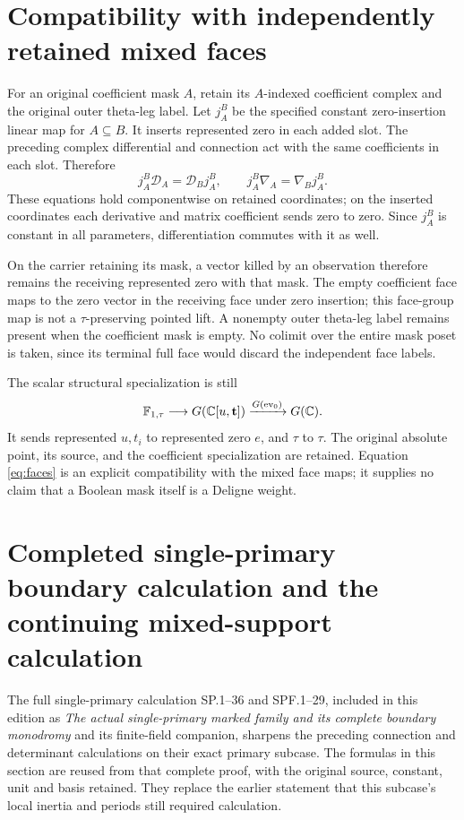 \section{Compatibility with independently retained mixed faces}

For an original coefficient mask $A$, retain its $A$-indexed coefficient
complex and the original outer theta-leg label.  Let
$j_A^B$ be the specified constant zero-insertion linear map for
$A\subseteq B$.  It inserts represented zero in each added slot.
The preceding complex differential and connection act with the same
coefficients in each slot.  Therefore
\begin{equation}
 j_A^B\mathcal D_A=\mathcal D_Bj_A^B,
 \qquad j_A^B\nabla_A=\nabla_Bj_A^B.
 \label{eq:faces}
\end{equation}
These equations hold componentwise on retained coordinates; on the
inserted coordinates each derivative and matrix coefficient sends zero
to zero.  Since $j_A^B$ is constant in all parameters, differentiation
commutes with it as well.

On the carrier retaining its mask, a vector killed by an observation
therefore remains the receiving represented zero with that mask.
The empty coefficient face maps to the zero vector in the receiving
face under zero insertion; this face-group map is not a
$\tau$-preserving pointed lift.  A nonempty outer theta-leg label
remains present when the coefficient mask is empty.  No colimit over
the entire mask poset is taken, since its terminal full face would
discard the independent face labels.

The scalar structural specialization is still
\[
 \mathbb F_{1,\tau}\longrightarrow G(\mathbb C[u,\mathbf t])
       \xrightarrow{G(\operatorname{ev}_0)}G(\mathbb C).
\]
It sends represented $u,t_i$ to represented zero $e$, and $\tau$ to
$\tau$.  The original absolute point, its source, and the coefficient
specialization are retained.  Equation \eqref{eq:faces} is an explicit
compatibility with the mixed face maps; it supplies no claim that a
Boolean mask itself is a Deligne weight.

\section{Completed single-primary boundary calculation and the continuing mixed-support calculation}
\label{sec:bc-single-primary-update}

The full single-primary calculation SP.1--36 and SPF.1--29,
included in this edition as
\emph{The actual single-primary marked family and its complete boundary
monodromy} and its finite-field companion, sharpens the preceding
connection and determinant calculations on their exact primary
subcase.  The formulas in this section are reused from that complete
proof, with the original source, constant, unit and basis retained.
They replace the earlier statement that this subcase's local inertia
and periods still required calculation.

